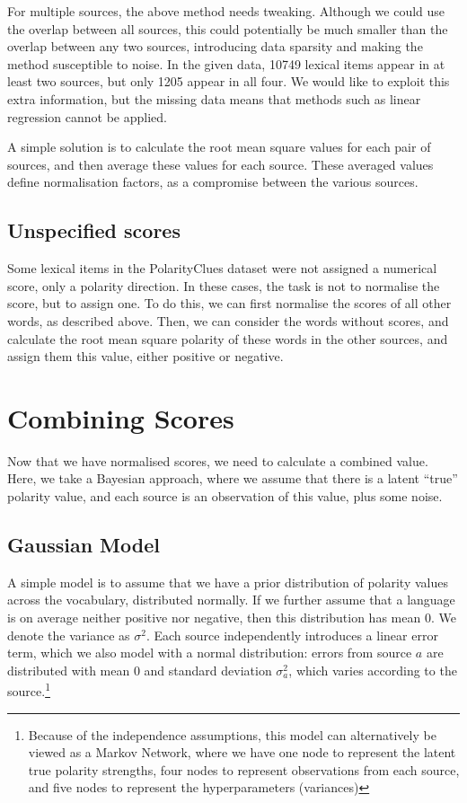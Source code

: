 \documentclass[11pt]{article}
\begin{document}
For multiple sources, the above method needs tweaking.
Although we could use the overlap between all sources, this could
potentially be much smaller than the overlap between any two sources,
introducing data sparsity and making the method susceptible to noise.
In the given data, 10749 lexical items appear in at least two sources,
but only 1205 appear in all four. We would like to exploit this extra
information, but the missing data means that methods such as linear
regression cannot be applied.

A simple solution is to calculate the root mean square values for each pair of sources, and then average these values for each source.  These averaged values define normalisation factors, as a compromise between the various sources.


\subsection{Unspecified scores}

Some lexical items in the PolarityClues dataset were not assigned a numerical score, only a polarity direction.  In these cases, the task is not to normalise the score, but to assign one.  To do this, we can first normalise the scores of all other words, as described above.  Then, we can consider the words without scores, and calculate the root mean square polarity of these words in the other sources, and assign them this value, either positive or negative.



\section{Combining Scores} \label{sec:combine}

Now that we have normalised scores, we need to calculate a combined value. Here, we take a Bayesian approach, where we assume that there is a latent ``true'' polarity value, and each source is an observation of this value, plus some noise.


\subsection{Gaussian Model} \label{sec:model}

A simple model is to assume that we have a prior distribution of polarity values across the vocabulary, distributed normally. If we further assume that a language is on average neither positive nor negative, then this distribution has mean $0$. We denote the variance as $\sigma^{2}$. Each source independently introduces a linear error term, which we also model with a normal distribution: errors from source $a$ are distributed with mean $0$ and standard deviation $\sigma_{a}^{2}$, which varies according to the source.\footnote{Because of the independence assumptions, this model can alternatively be viewed as a Markov Network, where we have one node to represent the latent true polarity strengths, four nodes to represent observations from each source, and five nodes to represent the hyperparameters (variances)}
\end{document}
